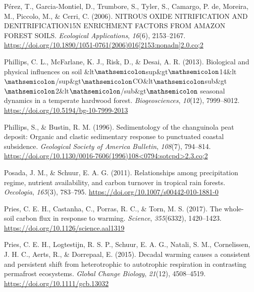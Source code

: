 \documentclass[]{article}
\begin{document}
\leavevmode\hypertarget{ref-P_rez_2006}{}%
Pérez, T., Garcia-Montiel, D., Trumbore, S., Tyler, S., Camargo, P. de,
Moreira, M., Piccolo, M., \& Cerri, C. (2006). NITROUS OXIDE
NITRIFICATION AND DENITRIFICATION15N ENRICHMENT FACTORS FROM AMAZON
FOREST SOILS. \emph{Ecological Applications}, \emph{16}(6), 2153--2167.
\href{https://doi.org/10.1890/1051-0761(2006)016\%5B2153:nonadn\%5D2.0.co;2}{https://doi.org/10.1890/1051-0761(2006)016{[}2153:nonadn{]}2.0.co;2}

\leavevmode\hypertarget{ref-Phillips_2013}{}%
Phillips, C. L., McFarlane, K. J., Risk, D., \& Desai, A. R. (2013).
Biological and physical influences on soil
\&lt\(\mathsemicolon\)sup\&gt\(\mathsemicolon\)14\&lt\(\mathsemicolon\)/sup\&gt\(\mathsemicolon\)CO\&lt\(\mathsemicolon\)sub\&gt\(\mathsemicolon\)2\&lt\(\mathsemicolon\)/sub\&gt\(\mathsemicolon\)
seasonal dynamics in a temperate hardwood forest. \emph{Biogeosciences},
\emph{10}(12), 7999--8012. \url{https://doi.org/10.5194/bg-10-7999-2013}

\leavevmode\hypertarget{ref-Phillips_1996}{}%
Phillips, S., \& Bustin, R. M. (1996). Sedimentology of the changuinola
peat deposit: Organic and clastic sedimentary response to punctuated
coastal subsidence. \emph{Geological Society of America Bulletin},
\emph{108}(7), 794--814.
\href{https://doi.org/10.1130/0016-7606(1996)108\%3C0794:sotcpd\%3E2.3.co;2}{https://doi.org/10.1130/0016-7606(1996)108\textless{}0794:sotcpd\textgreater{}2.3.co;2}

\leavevmode\hypertarget{ref-Posada_2011}{}%
Posada, J. M., \& Schuur, E. A. G. (2011). Relationships among
precipitation regime, nutrient availability, and carbon turnover in
tropical rain forests. \emph{Oecologia}, \emph{165}(3), 783--795.
\url{https://doi.org/10.1007/s00442-010-1881-0}

\leavevmode\hypertarget{ref-Hicks_Pries_2017}{}%
Pries, C. E. H., Castanha, C., Porras, R. C., \& Torn, M. S. (2017). The
whole-soil carbon flux in response to warming. \emph{Science},
\emph{355}(6332), 1420--1423.
\url{https://doi.org/10.1126/science.aal1319}

\leavevmode\hypertarget{ref-Hicks_Pries_2015}{}%
Pries, C. E. H., Logtestijn, R. S. P., Schuur, E. A. G., Natali, S. M.,
Cornelissen, J. H. C., Aerts, R., \& Dorrepaal, E. (2015). Decadal
warming causes a consistent and persistent shift from heterotrophic to
autotrophic respiration in contrasting permafrost ecosystems.
\emph{Global Change Biology}, \emph{21}(12), 4508--4519.
\url{https://doi.org/10.1111/gcb.13032}
\end{document}
